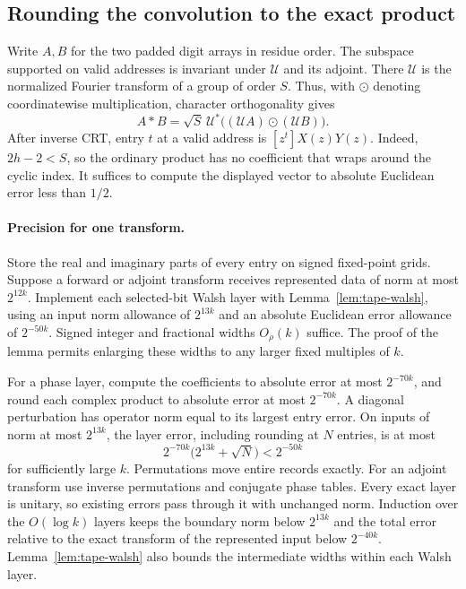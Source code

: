 \subsection{Rounding the convolution to the exact product}

Write \(A,B\) for the two padded digit arrays in residue order.
The subspace supported on valid addresses is invariant under
\(\mathcal U\) and its adjoint. There \(\mathcal U\) is the normalized
Fourier transform of a group of order \(S\). Thus, with \(\odot\)
denoting coordinatewise multiplication, character orthogonality gives
\[
 A*B=\sqrt S\,\mathcal U^*
                  \bigl((\mathcal U A)\odot(\mathcal U B)\bigr).
\]
After inverse CRT, entry \(t\) at a valid address is \([z^t]X(z)Y(z)\).
Indeed, \(2h-2<S\), so the ordinary product has no coefficient that wraps
around the cyclic index. It suffices to compute the displayed vector
to absolute Euclidean error less than \(1/2\).

\paragraph{Precision for one transform.}
Store the real and imaginary parts of every entry on signed fixed-point
grids. Suppose a forward or adjoint transform receives represented data
of norm at most \(2^{12k}\). Implement each selected-bit Walsh layer
with Lemma~\ref{lem:tape-walsh}, using an input norm allowance of
\(2^{13k}\) and an absolute Euclidean error allowance of \(2^{-50k}\).
Signed integer and fractional widths \(O_\rho(k)\) suffice. The proof
of the lemma permits enlarging these widths to any larger fixed
multiples of \(k\).

For a phase layer, compute the coefficients to absolute error at
most \(2^{-70k}\), and round each complex product to absolute error at
most \(2^{-70k}\). A diagonal perturbation has operator norm equal to
its largest entry error. On inputs of norm at most \(2^{13k}\), the
layer error, including rounding at \(N\) entries, is at most
\[
       2^{-70k}\bigl(2^{13k}+\sqrt N\bigr)<2^{-50k}
\]
for sufficiently large \(k\). Permutations move entire records
exactly. For an adjoint transform use inverse permutations and
conjugate phase tables. Every exact layer is unitary, so existing
errors pass through it with unchanged norm. Induction over the
\(O(\log k)\) layers keeps the boundary norm below \(2^{13k}\) and
the total error relative to the exact transform of the represented
input below \(2^{-40k}\). Lemma~\ref{lem:tape-walsh} also bounds
the intermediate widths within each Walsh layer.

